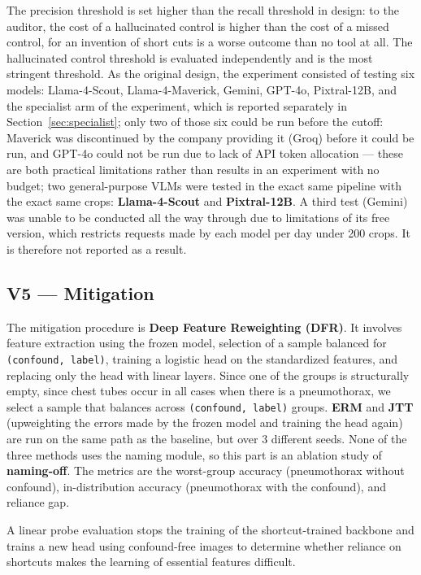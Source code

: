 \documentclass{ieeeaccess}
\begin{document}
The precision threshold is set higher than the recall threshold in design: to the auditor, the cost of a hallucinated control is higher than the cost of a missed control, for an invention of short cuts is a worse outcome than no tool at all. The hallucinated control threshold is evaluated independently and is the most stringent threshold. As the original design, the experiment consisted of testing six models: Llama-4-Scout, Llama-4-Maverick, Gemini, GPT-4o, Pixtral-12B, and the specialist arm of the experiment, which is reported separately in Section~\ref{sec:specialist}; only two of those six could be run before the cutoff: Maverick was discontinued by the company providing it (Groq) before it could be run, and GPT-4o could not be run due to lack of API token allocation --- these are both practical limitations rather than results in an experiment with no budget; two general-purpose VLMs were tested in the exact same pipeline with the exact same crops: \textbf{Llama-4-Scout} and \textbf{Pixtral-12B}. A third test (Gemini) was unable to be conducted all the way through due to limitations of its free version, which restricts requests made by each model per day under 200 crops. It is therefore not reported as a result.

\subsection{V5 --- Mitigation}
The mitigation procedure is \textbf{Deep Feature Reweighting (DFR)}. It involves feature extraction using the frozen model, selection of a sample balanced for \texttt{(confound, label)}, training a logistic head on the standardized features, and replacing only the head with linear layers. Since one of the groups is structurally empty, since chest tubes occur in all cases when there is a pneumothorax, we select a sample that balances across \texttt{(confound, label)} groups. \textbf{ERM} and \textbf{JTT} (upweighting the errors made by the frozen model and training the head again) are run on the same path as the baseline, but over 3 different seeds. None of the three methods uses the naming module, so this part is an ablation study of \textbf{naming-off}. The metrics are the worst-group accuracy (pneumothorax without confound), in-distribution accuracy (pneumothorax with the confound), and reliance gap.

A linear probe evaluation stops the training of the shortcut-trained backbone and trains a new head using confound-free images to determine whether reliance on shortcuts makes the learning of essential features difficult.
\end{document}
